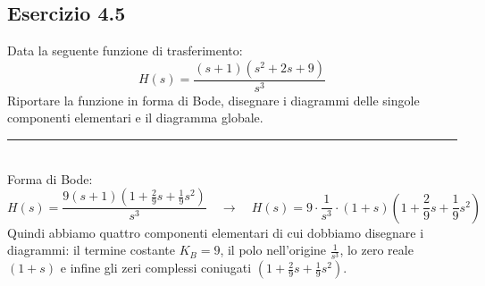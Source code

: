 \documentclass[12pt,a4paper]{article}
\begin{document}
	\subsection*{Esercizio 4.5} Data la seguente funzione di trasferimento:
	\[
		H(s) = \frac{(s+1)(s^2+2s+9)}{s^3}
	\]
	Riportare la funzione in forma di Bode, disegnare i diagrammi delle singole componenti elementari e il diagramma globale.
	\par\noindent\rule{\textwidth}{0.4pt}
	\vspace{5mm}
	\\
	Forma di Bode:
	\[
		H(s) = \frac{9(s+1)\left(1+\frac{2}{9}s+\frac{1}{9}s^2\right)}{s^3}\quad\rightarrow\quad H(s) = 9 \cdot \frac{1}{s^3}\cdot (1+s)\left(1+\frac{2}{9}s+\frac{1}{9}s^2\right)
	\]
	Quindi abbiamo quattro componenti elementari di cui dobbiamo disegnare i diagrammi: il termine costante $K_B = 9$, il polo nell'origine $\frac{1}{s^3}$, lo zero reale $(1+s)$ e infine gli zeri complessi coniugati $\left(1+\frac{2}{9}s+\frac{1}{9}s^2\right)$.\\
\end{document}
